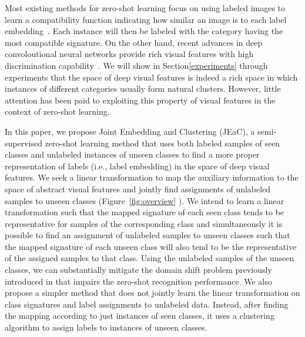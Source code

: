 \documentclass[10pt,twocolumn,letterpaper]{article}
\begin{document}
Most existing methods for zero-shot learning focus on using labeled images to learn a compatibility function indicating how similar an image is
to each label embedding~\cite{Akata2015,emb15,sse}. Each instance will then be labeled with the category having the most compatible signature.
 On the other hand, recent advances in deep convoloutional neural networks provide rich visual features with high discrimination capability~\cite{vgg}.
  We will show in Section\ref{experiments} through experiments that the space of deep visual features is indeed a rich space in which instances of different categories usually form natural clusters. However, little attention has been paid to exploiting this property of visual features in the context of zero-shot learning.


In this paper, we propose Joint Embedding and Clustering (JEaC),
a semi-supervised zero-shot learning method that uses both labeled samples of seen classes and unlabeled instances
 of unseen classes to find a more proper representation of labels (i.e., label embedding) in the space of deep visual features.
  We seek a linear transformation to map the auxiliary information to the space of abstract
   visual features and jointly find assignments of unlabeled samples to unseen classes (Figure~\ref{fig:overview} ).
We intend to learn a linear transformation such that the mapped signature of each seen class tends to be representative
 for samples of the corresponding class and simultaneously
it is possible to find an assignment of unlabeled samples to unseen classes such that the mapped signature of each unseen class
will also tend to be the representative of the assigned samples to that class.
Using the unlabeled samples of the unseen classes, we can substantially mitigate the domain shift problem previously introduced in \cite{eccv14} that impairs the zero-shot recognition performance.
We also propose a simpler method that does not jointly learn the linear transformation on class signatures and label assignments to unlabeled data.
Instead, after finding the mapping according to just instances of seen classes, it uses a clustering algorithm to assign labels to instances of unseen classes. %
\end{document}
